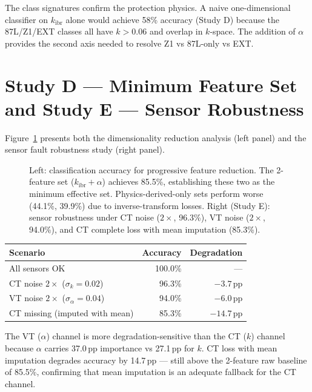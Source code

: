 \documentclass[11pt,a4paper]{article}
\begin{document}
\noindent
The class signatures confirm the protection physics.  A naive
one-dimensional classifier on $k_\mathrm{ibr}$ alone would achieve 58\%
accuracy (Study D) because the 87L/Z1/EXT classes all have $k>0.06$ and
overlap in $k$-space.  The addition of $\alpha$ provides the second axis
needed to resolve Z1 vs 87L-only vs EXT.

\section{Study D --- Minimum Feature Set and Study E --- Sensor Robustness}
\label{sec:studyDE}

Figure~\ref{fig:minset} presents both the dimensionality reduction analysis
(left panel) and the sensor fault robustness study (right panel).

\begin{figure}[htbp]
  \centering
  \resizebox{0.96\textwidth}{!}{}
  \caption{Left: classification accuracy for progressive feature reduction.
           The 2-feature set ($k_\mathrm{ibr}+\alpha$) achieves 85.5\%,
           establishing these two as the minimum effective set.
           Physics-derived-only sets perform worse (44.1\%, 39.9\%)
           due to inverse-transform losses.  Right (Study E): sensor
           robustness under CT noise ($2\times$, 96.3\%), VT noise ($2\times$,
           94.0\%), and CT complete loss with mean imputation (85.3\%).}
  \label{fig:minset}
\end{figure}

\begin{center}
\begin{tabular}{@{}lrr@{}}
\toprule
Scenario & Accuracy & Degradation \\
\midrule
All sensors OK & 100.0\% & --- \\
CT noise $2\times$ ($\sigma_k=0.02$) & 96.3\% & $-3.7$\,pp \\
VT noise $2\times$ ($\sigma_\alpha=0.04$) & 94.0\% & $-6.0$\,pp \\
CT missing (imputed with mean) & 85.3\% & $-14.7$\,pp \\
\bottomrule
\end{tabular}
\end{center}

\medskip\noindent
The VT ($\alpha$) channel is more degradation-sensitive than the CT ($k$)
channel because $\alpha$ carries 37.0\,pp importance vs 27.1\,pp for $k$.
CT loss with mean imputation degrades accuracy by 14.7\,pp --- still above
the 2-feature raw baseline of 85.5\%, confirming that mean imputation is an
adequate fallback for the CT channel.
\end{document}
